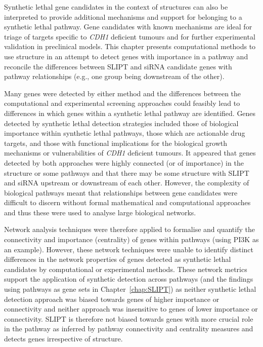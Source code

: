 Synthetic lethal gene candidates in the context of  structures can also be interpreted to provide additional mechanisms and support for belonging to a \gls{synthetic lethal} \gls{pathway}. Gene candidates with known mechanisms are ideal for triage of targets specific to \textit{CDH1} deficient tumours and for further experimental validation in preclinical models.
This chapter presents computational methods to use  structure in an attempt to detect genes with importance in a \gls{pathway} and reconcile the differences between \gls{SLIPT} and \gls{siRNA} candidate genes with \gls{pathway} relationships (e.g., one group being downstream of the other).

Many genes were detected by either method and the differences between the computational and experimental screening approaches could feasibly lead to differences in which genes within a \gls{synthetic lethal} \gls{pathway} are identified. Genes detected by \gls{synthetic lethal} detection strategies included those of biological importance within \gls{synthetic lethal} \glspl{pathway}, those which are actionable drug targets, and those with functional implications for the biological growth mechanisms or vulnerabilities of \textit{CDH1} deficient tumours. It appeared that genes detected by both approaches were highly connected (or of importance) in the  structure or some \glspl{pathway} and that there may be some structure with \gls{SLIPT} and \gls{siRNA} upstream or downstream of each other. However, the complexity of biological \glspl{pathway} meant that relationships between gene candidates were difficult to discern without formal mathematical and computational approaches and thus these were used to analyse large biological networks.

Network analysis techniques were therefore applied to formalise and quantify the connectivity and importance (centrality) of genes within \glspl{pathway} (using \gls{PI3K} as an example). However, these network techniques were unable to identify distinct differences in the network properties of genes detected as \gls{synthetic lethal} candidates by computational or experimental methods. These network metrics support the application of synthetic detection across \glspl{pathway} (and the findings using \glspl{pathway} as gene sets in Chapter~\ref{chap:SLIPT}) as neither \gls{synthetic lethal} detection approach was biased towards genes of higher importance or connectivity and neither approach was insensitive to genes of lower  importance or connectivity. \gls{SLIPT} is therefore not biased towards genes with  more crucial role in the \gls{pathway} as inferred by \gls{pathway} connectivity and \gls{centrality} measures and detects genes irrespective of  structure. 

